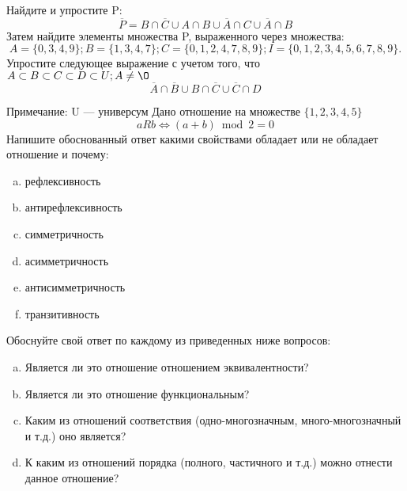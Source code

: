 \documentclass[10pt]{exam}
\begin{document}
\begin{questions}
\question
Найдите и упростите P:
\begin{equation*}
\overline{P} = B \cap \overline{C} \cup A \cap B \cup \overline{A} \cap C \cup \overline{A} \cap B
\end{equation*}
Затем найдите элементы множества P, выраженного через множества:
\begin{equation*}
A = \{0, 3, 4, 9\}; 
B = \{1, 3, 4, 7\};
C = \{0, 1, 2, 4, 7, 8, 9\};
I = \{0, 1, 2, 3, 4, 5, 6, 7, 8, 9\}.
\end{equation*}\question
Упростите следующее выражение с учетом того, что $A\subset B \subset C \subset D \subset U; A \neq \O$
\begin{equation*}
\overline{A} \cap \overline{B} \cup B \cap \overline{C} \cup \overline{C} \cap D
\end{equation*}

Примечание: U — универсум\question
Дано отношение на множестве $\{1, 2, 3, 4, 5\}$ 
\begin{equation*}
aRb \iff (a+b) \bmod 2 =0
\end{equation*}
Напишите обоснованный ответ какими свойствами обладает или не обладает отношение и почему:   
\begin{enumerate} [a)]\setcounter{enumi}{0}
\item рефлексивность
\item антирефлексивность
\item симметричность
\item асимметричность
\item антисимметричность
\item транзитивность
\end{enumerate}

Обоснуйте свой ответ по каждому из приведенных ниже вопросов:
\begin{enumerate} [a)]\setcounter{enumi}{0}
    \item Является ли это отношение отношением эквивалентности?
    \item Является ли это отношение функциональным?
    \item Каким из отношений соответствия (одно-многозначным, много-многозначный и т.д.) оно является?
    \item К каким из отношений порядка (полного, частичного и т.д.) можно отнести данное отношение?
\end{enumerate}




\end{questions}
\end{document}
